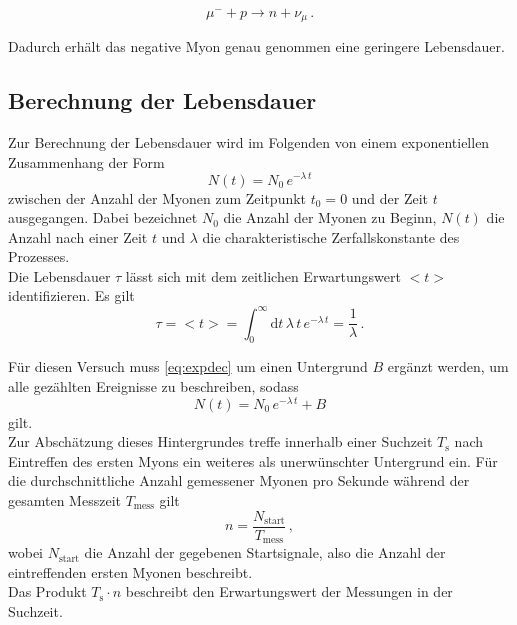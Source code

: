 \begin{equation*}
    \mu^- + p \rightarrow n + \nu_\mu \,.
\end{equation*}

Dadurch erhält das negative Myon genau genommen eine geringere Lebensdauer.


\subsection{Berechnung der Lebensdauer}

Zur Berechnung der Lebensdauer wird im Folgenden von einem exponentiellen Zusammenhang der Form
\begin{equation}
    N(t) = N_0 \, e^{-\lambda \, t}
    \label{eq:expdec}
\end{equation}
zwischen der Anzahl der Myonen zum Zeitpunkt $t_0 = 0$ und der Zeit $t$ ausgegangen. 
Dabei bezeichnet $N_0$ die Anzahl der Myonen zu Beginn, $N(t)$ die Anzahl nach einer Zeit $t$ und $\lambda$ die charakteristische Zerfallskonstante des Prozesses. \\

Die Lebensdauer $\tau$ lässt sich mit dem zeitlichen Erwartungswert $<t>$ identifizieren.
Es gilt
\begin{equation}
    \tau = <t> = \int_0^\infty \text{d} t \, \lambda \, t \, e^{-\lambda \, t} = \frac{1}{\lambda} \,.
\end{equation} 

Für diesen Versuch muss \eqref{eq:expdec} um einen Untergrund $B$ ergänzt werden, um alle gezählten Ereignisse zu beschreiben, sodass
\begin{equation}
    N(t) = N_0 \, e^{-\lambda \, t} + B
    \label{eq:exponential_decay}
\end{equation}
gilt. \\

Zur Abschätzung dieses Hintergrundes treffe innerhalb einer Suchzeit $T_\text{s}$ nach Eintreffen des ersten Myons ein weiteres als unerwünschter Untergrund ein.
Für die durchschnittliche Anzahl gemessener Myonen pro Sekunde während der gesamten Messzeit $T_\text{mess}$ gilt
\begin{equation*}
    n = \frac{N_\text{start}}{T_\text{mess}} \,,
\end{equation*}
wobei $N_\text{start}$ die Anzahl der gegebenen Startsignale, also die Anzahl der eintreffenden ersten Myonen beschreibt. \\

Das Produkt $T_\text{s} \cdot n$ beschreibt den Erwartungswert der Messungen in der Suchzeit. \\

